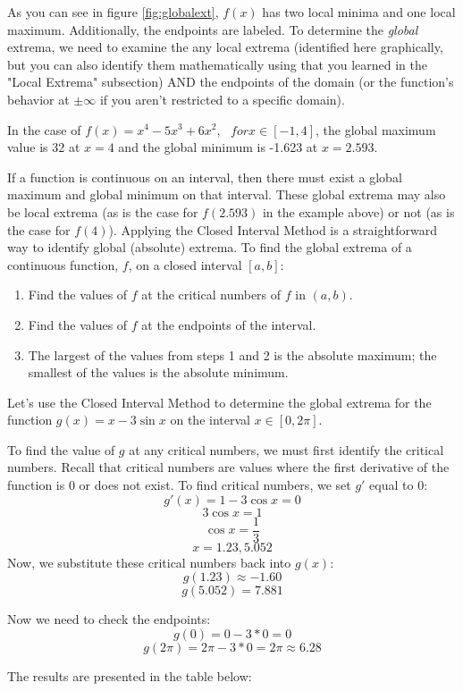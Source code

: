 As you can see in figure \ref{fig:globalext}, $f(x)$ has two local minima and 
one local maximum. Additionally, the endpoints are labeled. To determine the 
\textit{global} extrema, we need to examine the any local extrema (identified 
here graphically, but you can also identify them mathematically using that you 
learned in the "Local Extrema" subsection) AND the endpoints of the domain (or 
the function's behavior at $\pm \infty$ if you aren't restricted to a specific 
domain). 

In the case of $f(x) = x^4-5x^3+6x^2,\text{ }for x\in [-1,4]$, the global 
maximum value is 32 at $x=4$ and the global minimum is -1.623 at $x=2.593$. 

If a function is continuous on an interval, then there must exist a global 
maximum and global minimum on that interval. These global extrema may also be 
local extrema (as is the case for $f(2.593)$ in the example above) or not (as 
is the case for $f(4)$). Applying the Closed Interval Method is a 
straightforward way to identify global (absolute) extrema. To find the global 
extrema of a continuous function, $f$, on a closed interval $[a, b]$:
\begin{enumerate}
	\item Find the values of $f$ at the critical numbers of $f$ in $(a, b)$.
	\item Find the values of $f$ at the endpoints of the interval.
	\item The largest of the values from steps 1 and 2 is the absolute maximum; 
	the smallest of the values is the absolute minimum.
\end{enumerate}

Let's use the Closed Interval Method to determine the global extrema for the 
function $g(x) = x-3\sin{x}$ on the interval $x \in [0, 2\pi]$.

To find the value of $g$ at any critical numbers, we must first identify the 
critical numbers. Recall that critical numbers are values where the first 
derivative of the function is $0$ or does not exist. To find critical numbers, 
we set $g'$ equal to $0$:
$$g'(x) = 1-3\cos{x}=0$$
$$3\cos{x} = 1$$
$$\cos{x} = \frac{1}{3}$$
$$x=1.23, 5.052$$
Now, we substitute these critical numbers back into $g(x)$:
$$g(1.23) \approx -1.60$$
$$g(5.052) = 7.881$$

Now we need to check the endpoints:
$$g(0) = 0-3*0 = 0$$
$$g(2\pi) = 2\pi - 3*0 = 2\pi \approx 6.28$$

The results are presented in the table below:

